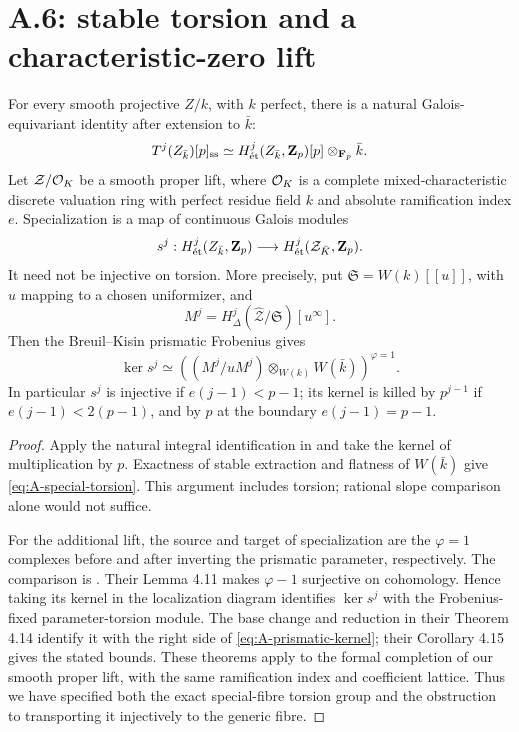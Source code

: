 \section{A.6: stable torsion and a characteristic-zero lift}
\label{sec:A-lifting}

\begin{theorem}\label{thm:A-special-torsion}
 For every smooth projective
$Z/k$, with $k$ perfect, there is a natural Galois-equivariant identity
after extension to $\bar k$:
\begin{equation}\label{eq:A-special-torsion}
 T^j(Z_{\bar k})[p]_{\ss}\simeq
 H^j_{\et}(Z_{\bar k},\Zp)[p]\otimes_{\Fp}\bar k.
\end{equation}
Let $\mathcal Z/\OO_K$ be a smooth proper lift, where $\OO_K$ is a
complete mixed-characteristic discrete valuation ring with perfect
residue field $k$ and absolute ramification index $e$.  Specialization
is a map of continuous Galois modules
\[
 s^j:H^j_{\et}(Z_{\bar k},\Zp)\longrightarrow
 H^j_{\et}(\mathcal Z_{\bar K},\Zp).
\]
It need not be injective on torsion.  More precisely, put
$\mathfrak S=W(k)[[u]]$, with $u$ mapping to a chosen uniformizer, and
\[
 M^j=H^j_\Delta(\widehat{\mathcal Z}/\mathfrak S)[u^\infty].
\]
Then the Breuil--Kisin prismatic Frobenius gives
\begin{equation}\label{eq:A-prismatic-kernel}
 \ker s^j\simeq
 \left((M^j/uM^j)\otimes_{W(k)}W(\bar k)\right)^{\varphi=1}.
\end{equation}
In particular $s^j$ is injective if $e(j-1)<p-1$; its kernel is killed
by $p^{j-1}$ if $e(j-1)<2(p-1)$, and by $p$ at the boundary
$e(j-1)=p-1$.
\end{theorem}
\begin{proof}
Apply the natural integral identification in
\citet[Corollary 4.11]{Ogus1975} and take the kernel of multiplication
by $p$.  Exactness of stable extraction and flatness of $W(\bar k)$
give \eqref{eq:A-special-torsion}.  This argument includes torsion;
rational slope comparison alone would not suffice.

For the additional lift, the source and target of specialization are
the $\varphi=1$ complexes before and after inverting the prismatic
parameter, respectively.  The comparison is
\citet[Theorem 4.10]{LiLiu2022}.  Their Lemma 4.11 makes
$\varphi-1$ surjective on cohomology.  Hence taking its kernel in the
localization diagram identifies $\ker s^j$ with the Frobenius-fixed
parameter-torsion module.  The base change and reduction in their
Theorem 4.14 identify it with the right side of
\eqref{eq:A-prismatic-kernel}; their Corollary 4.15 gives the stated
bounds.  These theorems apply to the formal completion of our smooth
proper lift, with the same ramification index and coefficient lattice.
Thus we have specified both the exact special-fibre torsion group and
the obstruction to transporting it injectively to the generic fibre.
\end{proof}

